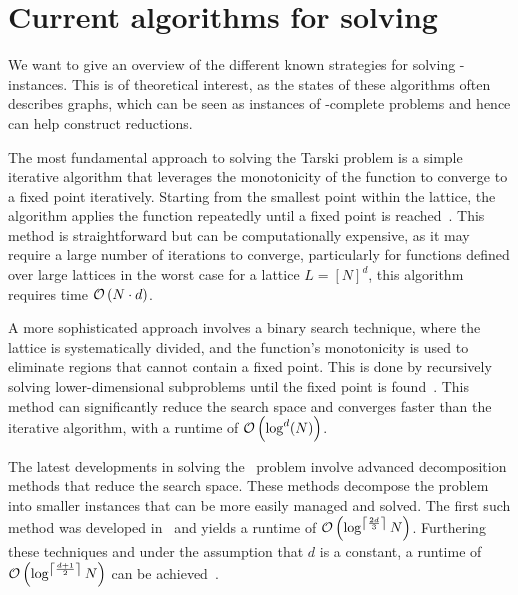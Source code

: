 \section{Current algorithms for solving \Tarski}\label{sec:intro_tarski_algorithms}

We want to give an overview of the different known strategies for solving \Tarski-instances. This is of theoretical interest, as the states of these algorithms often describes graphs, which can be seen as instances of \TFNP-complete problems and hence can help construct reductions.

The most fundamental approach to solving the Tarski problem is a simple iterative algorithm that leverages the monotonicity of the function to converge to a fixed point iteratively. Starting from the smallest point within the lattice, the algorithm applies the function repeatedly until a fixed point is reached~. This method is straightforward but can be computationally expensive, as it may require a large number of iterations to converge, particularly for functions defined over large lattices in the worst case for a lattice $L = {[N]}^d$, this algorithm requires time $\mathcal{O}\left(N \cdot d\right)$.

A more sophisticated approach involves a binary search technique, where the lattice is systematically divided, and the function's monotonicity is used to eliminate regions that cannot contain a fixed point. This is done by recursively solving lower-dimensional subproblems until the fixed point is found~. This method can significantly reduce the search space and converges faster than the iterative algorithm, with a runtime of $\mathcal{O}\left(\log^d(N)\right)$.

The latest developments in solving the \Tarski\ problem involve advanced decomposition methods that reduce the search space. These methods decompose the problem into smaller instances that can be more easily managed and solved. The first such method was developed in~\cite{fearnley_faster_2022} and yields a runtime of $\mathcal{O}\left(\log^{\left\lceil\frac{2d}{3}\right\rceil}{N}\right)$. Furthering these techniques and under the assumption that $d$ is a constant, a runtime of $\mathcal{O}\left(\log^{\left\lceil\frac{d+1}{2}\right\rceil}{N}\right)$ can be achieved~.


